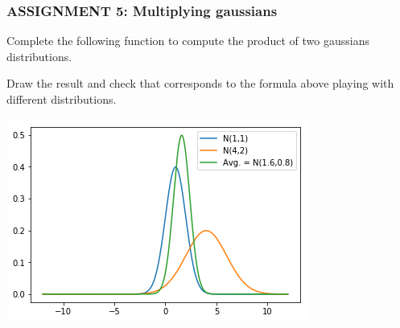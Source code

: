 \documentclass[11pt]{article}
\begin{document}
    \hypertarget{assignment-5-multiplying-gaussians}{%
\subsubsection{\texorpdfstring{\textbf{{ASSIGNMENT 5: Multiplying
gaussians}}}{ASSIGNMENT 5: Multiplying gaussians}}\label{assignment-5-multiplying-gaussians}}

Complete the following function to compute the product of two gaussians
distributions.

Draw the result and check that corresponds to the formula above playing
with different distributions.

\includegraphics{images/fig2-2-3.png}
\end{document}
